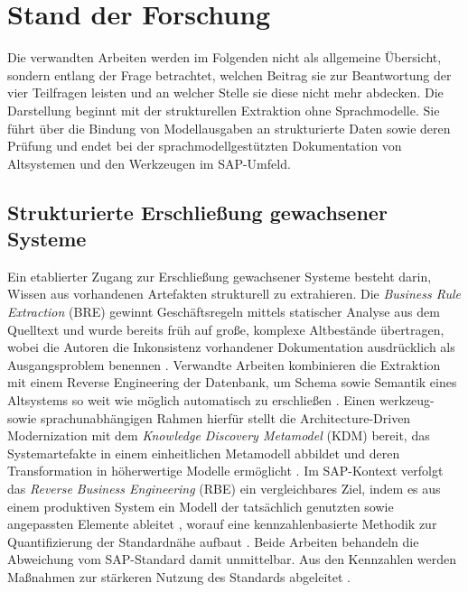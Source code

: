 \section{Stand der Forschung}
\label{sec:stand-forschung}

Die verwandten Arbeiten werden im Folgenden nicht als allgemeine Übersicht, sondern entlang der Frage betrachtet, welchen Beitrag sie zur Beantwortung der vier Teilfragen leisten und an welcher Stelle sie diese nicht mehr abdecken. Die Darstellung beginnt mit der strukturellen Extraktion ohne Sprachmodelle. Sie führt über die Bindung von Modellausgaben an strukturierte Daten sowie deren Prüfung und endet bei der sprachmodellgestützten Dokumentation von Altsystemen und den Werkzeugen im SAP-Umfeld.

\subsection{Strukturierte Erschließung gewachsener Systeme}
\label{subsec:rw-erschliessung}

Ein etablierter Zugang zur Erschließung gewachsener Systeme besteht darin, Wissen aus vorhandenen Artefakten strukturell zu extrahieren. Die \emph{Business Rule Extraction} (BRE) gewinnt Geschäftsregeln mittels statischer Analyse aus dem Quelltext und wurde bereits früh auf große, komplexe Altbestände übertragen, wobei die Autoren die Inkonsistenz vorhandener Dokumentation ausdrücklich als Ausgangsproblem benennen \cite{wang_business_2004}. Verwandte Arbeiten kombinieren die Extraktion mit einem Reverse Engineering der Datenbank, um Schema sowie Semantik eines Altsystems so weit wie möglich automatisch zu erschließen \cite{paradauskas_business_2006}. Einen werkzeug- sowie sprachunabhängigen Rahmen hierfür stellt die Architecture-Driven Modernization mit dem \emph{Knowledge Discovery Metamodel} (KDM) bereit, das Systemartefakte in einem einheitlichen Metamodell abbildet und deren Transformation in höherwertige Modelle ermöglicht \cite{perez-castillo_knowledge_2011}. Im SAP-Kontext verfolgt das \emph{Reverse Business Engineering} (RBE) ein vergleichbares Ziel, indem es aus einem produktiven System ein Modell der tatsächlich genutzten sowie angepassten Elemente ableitet \cite{nuttgens_reverse_1999}, worauf eine kennzahlenbasierte Methodik zur Quantifizierung der Standardnähe aufbaut \cite{sekatzek_messung_2009}. Beide Arbeiten behandeln die Abweichung vom SAP-Standard damit unmittelbar. Aus den Kennzahlen werden Maßnahmen zur stärkeren Nutzung des Standards abgeleitet \cite{sekatzek_messung_2009}. %

